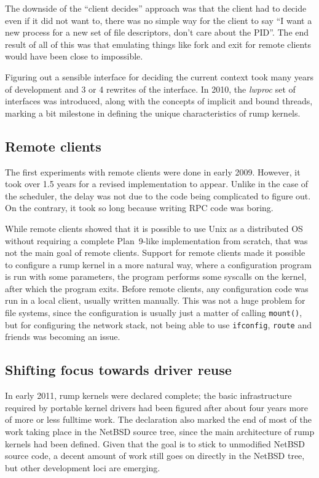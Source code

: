 The downside of the ``client decides'' approach was that the client
had to decide even if it did not want to, \ie there was no simple way
for the client to say ``I want a new process for a new set of file
descriptors, don't care about the PID''.  The end result of all of this
was that emulating things like fork and exit for remote clients would
have been close to impossible.

Figuring out a sensible interface for deciding the current context
took many years of development and 3 or 4 rewrites of the interface.
In 2010, the \textit{lwproc} set of interfaces was introduced, along with
the concepts of implicit and bound threads, marking a bit milestone in
defining the unique characteristics of rump kernels.


\subsection{Remote clients}

The first experiments with remote clients were done in early 2009.
However, it took over 1.5 years for a revised implementation to appear.
Unlike in the case of the scheduler, the delay was not due to the code
being complicated to figure out.  On the contrary, it took so long
because writing RPC code was boring.

While remote clients showed that it is possible to use Unix as a
distributed OS without requiring a complete Plan~9-like implementation
from scratch, that was not the main goal of remote clients.  Support for
remote clients made it possible to configure a rump kernel in a more
natural way, where a configuration program is run with some parameters,
the program performs some syscalls on the kernel, after which the program
exits.  Before remote clients, any configuration code was run in a local
client, usually written manually.  This was not a huge problem for
file systems, since the configuration is usually just a matter of
calling \verb+mount()+, but for configuring the network stack, not being
able to use \texttt{ifconfig}, \texttt{route} and friends was becoming
an issue.


\subsection{Shifting focus towards driver reuse}

In early 2011, rump kernels were declared complete; the basic
infrastructure required by portable kernel drivers had been figured after
about four years more of more or less fulltime work.  The declaration
also marked the end of most of the work taking place in the NetBSD source
tree, since the main architecture of rump kernels had been defined.
Given that the goal is to stick to unmodified NetBSD source code,
a decent amount of work still goes on directly in the NetBSD tree,
but other development loci are emerging.

